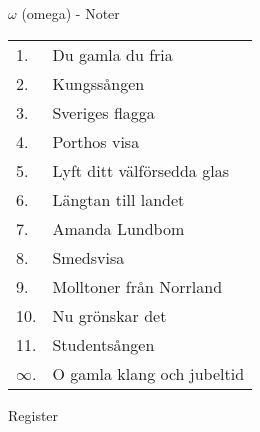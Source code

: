 \documentclass[a6paper,10pt]{article}
\begin{document}
\vspace{5pt}

\noindent \Large $\omega$ (omega) - Noter

\noindent
\normalsize
\begin{tabularx}{1\textwidth}{l X}
1.&Du gamla du fria\\
2.&Kungssången\\
3.&Sveriges flagga\\
4.&Porthos visa\\
5.&Lyft ditt välförsedda glas\\
6.&Längtan till landet\\
7.&Amanda Lundbom\\
8.&Smedsvisa\\
9.&Molltoner från Norrland\\
10.&Nu grönskar det\\
11.&Studentsången\\
$\infty$.&O gamla klang och jubeltid
\end{tabularx}

\vspace{5pt}

\noindent
\Large Register
\end{document}

